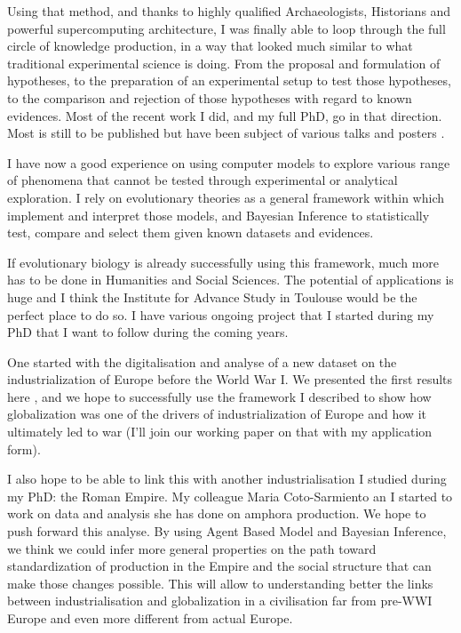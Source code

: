 \documentclass[10pt]{article}
\begin{document}
Using that method, and thanks to highly qualified Archaeologists, Historians and powerful supercomputing architecture,  I was finally able to loop through the full circle of knowledge production, in a way that looked much similar to what traditional experimental science is doing. From the proposal and formulation of hypotheses, to the preparation of an experimental setup to test those hypotheses, to the comparison and rejection of those hypotheses with regard to known evidences. Most of the recent work I did, and my full PhD, go in that direction. Most is still to be published but have been subject of various talks and posters \cite{coto2016exploringamphorabetica,carrignon2018abmtrac,romanowska2018jerash,carrignon2017impactofdifferentsociallearningmechanismsontheemergenceofawalrasianequilibrium,carrignon2018hpcmodel,carrignon2018}. 

I have now a good experience on using computer models to explore various range of phenomena that cannot be tested through experimental or analytical exploration. I rely on evolutionary theories as a general framework within which implement and interpret those models, and Bayesian Inference to statistically test, compare and select them given known datasets and evidences.

If evolutionary biology is already successfully using this framework, much more has to be done in Humanities and Social Sciences. The potential of applications is huge and I think the Institute for Advance Study in Toulouse would be the perfect place to do so. I have various ongoing project that I started during my PhD that I want to follow during the coming years.

One started with the digitalisation and analyse of a new dataset on the industrialization of Europe before the World War I. We presented the first results here \cite{carrignon2016patternsinglobalization}, and we hope to successfully use the framework I described to show how globalization was one of the drivers of industrialization of Europe and how it ultimately led to war (I'll join our working paper on that with my application form).

I also hope to be able to link this with another industrialisation I studied during my PhD: the Roman Empire. My colleague Maria Coto-Sarmiento an I started to work on data and analysis she has done on amphora production\cite{COTOSARMIENTO2018117}. We hope to push forward this analyse. By using Agent Based Model and Bayesian Inference, we think we could infer more general properties on the path toward standardization of production in the Empire and the social structure that can make those changes possible.  This will allow to understanding better the links between industrialisation and globalization in a civilisation far from pre-WWI Europe and even more different from actual Europe.
\end{document}

